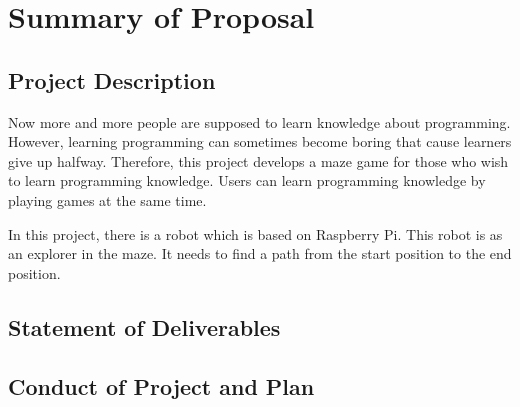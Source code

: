 \documentclass[11pt,times,oneside,openright,hardcopy]{eeereport}
\begin{document}

\mainmatter
{}

\chapter{Summary of Proposal}\label{cpt:sop}

\section{Project Description}
Now more and more people are supposed to learn knowledge about programming. However, learning programming can sometimes become boring that cause learners give up halfway.
Therefore, this project develops a maze game for those who wish to learn programming knowledge. Users can learn programming knowledge by playing games at the same time.

In this project, there is a robot which is based on Raspberry Pi. This robot is as an explorer in the maze. It needs to find a path from the start position to the end position. 
\section{Statement of Deliverables}

\section{Conduct of Project and Plan}
\end{document}
